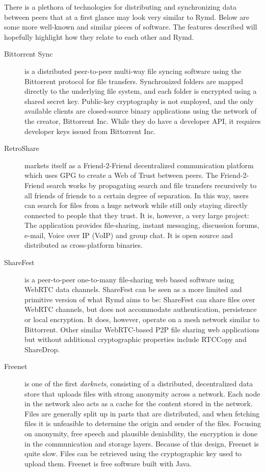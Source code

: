 There is a plethora of technologies for distributing and synchronizing data between peers that at a first glance may look very similar to Rymd. Below are some more well-known and similar pieces of software. The features described will hopefully highlight how they relate to each other and Rymd.

\begin{description}
  \item[Bittorrent Sync] \cite{BitTorent:2014:Online} is a distributed peer-to-peer multi-way file syncing software using the Bittorrent protocol for file transfers. Synchronized folders are mapped directly to the underlying file system, and each folder is encrypted using a shared secret key. Public-key cryptography is not employed, and the only available clients are closed-source binary applications using the network of the creator, Bittorrent Inc. While they do have a developer API, it requires developer keys issued from Bittorrent Inc.
  \item[RetroShare] \cite{Retroshare:2014:Online} markets itself as a Friend-2-Friend decentralized communication platform which uses GPG to create a Web of Trust between peers. The Friend-2-Friend search works by propagating search and file transfers recursively to all friends of friends to a certain degree of separation. In this way, users can search for files from a huge network while still only staying directly connected to people that they trust. It is, however, a very large project: The application provides file-sharing, instant messaging, discussion forums, e-mail, Voice over IP (VoIP) and group chat. It is open source and distributed as cross-platform binaries.
  \item[ShareFest] \cite{Sharefest:2014:Online} is a peer-to-peer one-to-many file-sharing web based software using WebRTC data channels. ShareFest can be seen as a more limited and primitive version of what Rymd aims to be: ShareFest can share files over WebRTC channels, but does not accommodate authentication, persistence or local encryption. It does, however, operate on a mesh network similar to Bittorrent. Other similar WebRTC-based P2P file sharing web applications but without additional cryptographic properties include RTCCopy and ShareDrop.
  \item[Freenet] \cite{Freenet:2014:Online} is one of the first \emph{darknets}, consisting of a distributed, decentralized data store that uploads files with strong anonymity across a network. Each node in the network also acts as a cache for the content stored in the network. Files are generally split up in parts that are distributed, and when fetching files it is unfeasible to determine the origin and sender of the files. Focusing on anonymity, free speech and plausible deniability, the encryption is done in the communication and storage layers. Because of this design, Freenet is quite slow. Files can be retrieved using the cryptographic key used to upload them. Freenet is free software built with Java.

\end{description}
